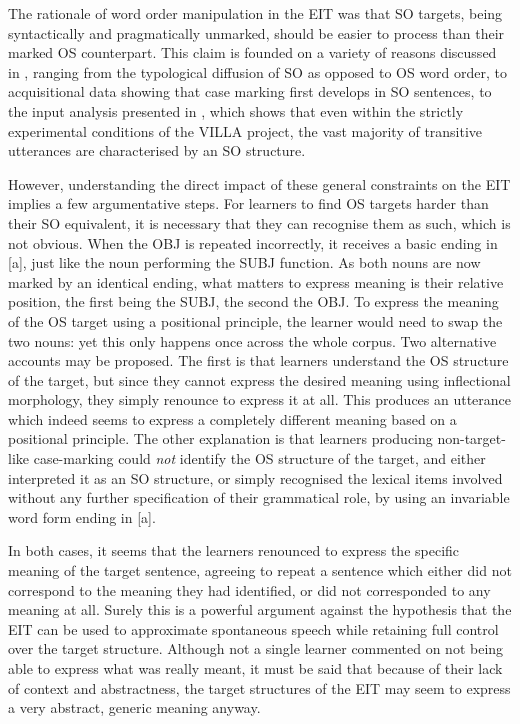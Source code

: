 The rationale of word order manipulation in the EIT was that SO targets, being syntactically and pragmatically unmarked, should be easier to process than their marked OS counterpart. This claim is founded on a variety of reasons discussed in , ranging from the typological diffusion of SO as opposed to OS word order, to acquisitional data showing that case marking first develops in SO sentences, to the input analysis presented in , which shows that even within the strictly experimental conditions of the VILLA project, the vast majority of transitive utterances are characterised by an SO structure.

However, understanding the direct impact of these general constraints on the EIT implies a few argumentative steps. For learners to find OS targets harder than their SO equivalent, it is necessary that they can recognise them as such, which is not obvious. When the OBJ is repeated incorrectly, it receives a basic ending in [a], just like the noun performing the SUBJ function. As both nouns are now marked by an identical ending, what matters to express meaning is their relative position, the first being the SUBJ, the second the OBJ. To express the meaning of the OS target using a positional principle, the learner would need to swap the two nouns: yet this only happens once across the whole corpus. Two alternative accounts may be proposed. The first is that learners understand the OS structure of the target, but since they cannot express the desired meaning using inflectional morphology, they simply renounce to express it at all. This produces an utterance which indeed seems to express a completely different meaning based on a positional principle. The other explanation is that learners producing non-target-like case-marking could \textit{not} identify the OS structure of the target, and either interpreted it as an SO structure, or simply recognised the lexical items involved without any further specification of their grammatical role, by using an invariable word form ending in [a]. 

In both cases, it seems that the learners renounced to express the specific meaning of the target sentence, agreeing to repeat a sentence which either did not correspond to the meaning they had identified, or did not corresponded to any meaning at all. Surely this is a powerful argument against the hypothesis that the EIT can be used to approximate spontaneous speech while retaining full control over the target structure. Although not a single learner commented on not being able to express what was really meant, it must be said that because of their lack of context and abstractness, the target structures of the EIT may seem to express a very abstract, generic meaning anyway. 

